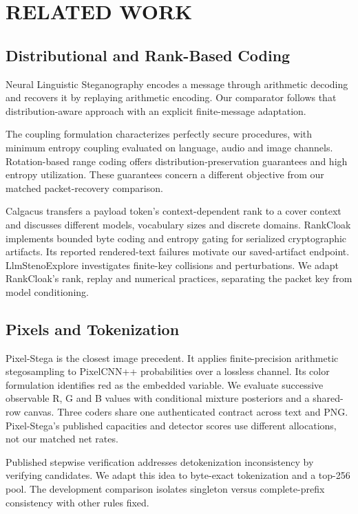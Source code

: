 \section{\uppercase{Related Work}}
\label{sec:related}
\subsection{Distributional and Rank-Based Coding}
Neural Linguistic Steganography \cite{ziegler} encodes a message through arithmetic decoding and recovers it by replaying arithmetic encoding. Our comparator follows that distribution-aware approach with an explicit finite-message adaptation.\aifootnote

The coupling formulation \cite{coupling} characterizes perfectly secure procedures, with minimum entropy coupling evaluated on language, audio and image channels. Rotation-based range coding \cite{range} offers distribution-preservation guarantees and high entropy utilization. These guarantees concern a different objective from our matched packet-recovery comparison.

Calgacus \cite{calgacus} transfers a payload token's context-dependent rank to a cover context and discusses different models, vocabulary sizes and discrete domains. RankCloak \cite{rankcloak} implements bounded byte coding and entropy gating for serialized cryptographic artifacts. Its reported rendered-text failures motivate our saved-artifact endpoint. LlmStenoExplore \cite{explore} investigates finite-key collisions and perturbations. We adapt RankCloak's rank, replay and numerical practices, separating the packet key from model conditioning.

\subsection{Pixels and Tokenization}
Pixel-Stega \cite{pixelstega} is the closest image precedent. It applies finite-precision arithmetic stegosampling to PixelCNN++ probabilities over a lossless channel. Its color formulation identifies red as the embedded variable. We evaluate successive observable R, G and B values with conditional mixture posteriors and a shared-row canvas. Three coders share one authenticated contract across text and PNG. Pixel-Stega's published capacities and detector scores use different allocations, not our matched net rates.

Published stepwise verification \cite{consistency} addresses detokenization inconsistency by verifying candidates. We adapt this idea to byte-exact tokenization and a top-256 pool. The development comparison isolates singleton versus complete-prefix consistency with other rules fixed.


